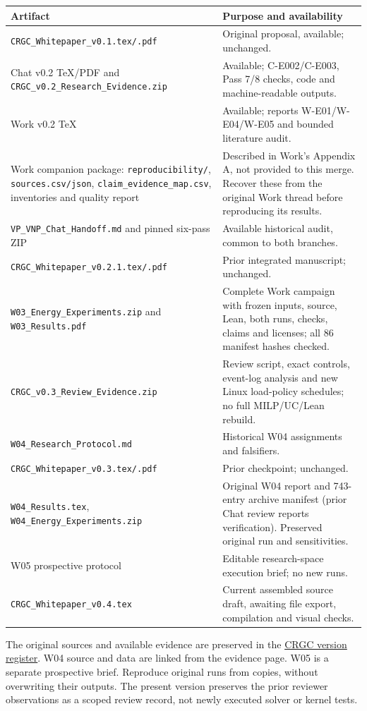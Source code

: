 \documentclass[11pt,letterpaper]{article}
\begin{document}
\begin{longtable}{P{.42\linewidth}P{.49\linewidth}}
\toprule Artifact & Purpose and availability\\\midrule\endhead
\texttt{CRGC\_Whitepaper\_v0.1.tex/.pdf} & Original proposal, available; unchanged.\\
Chat v0.2 TeX/PDF and \texttt{CRGC\_v0.2\_Research\_Evidence.zip} & Available; C-E002/C-E003, Pass 7/8 checks, code and machine-readable outputs.\\
Work v0.2 TeX & Available; reports W-E01/W-E04/W-E05 and bounded literature audit.\\
Work companion package: \texttt{reproducibility/}, \texttt{sources.csv/json}, \texttt{claim\_evidence\_map.csv}, inventories and quality report & Described in Work's Appendix A, not provided to this merge. Recover these from the original Work thread before reproducing its results.\\
\texttt{VP\_VNP\_Chat\_Handoff.md} and pinned six-pass ZIP & Available historical audit, common to both branches.\\
\texttt{CRGC\_Whitepaper\_v0.2.1.tex/.pdf} & Prior integrated manuscript; unchanged.\\
\texttt{W03\_Energy\_Experiments.zip} and \texttt{W03\_Results.pdf} & Complete Work campaign with frozen inputs, source, Lean, both runs, checks, claims and licenses; all 86 manifest hashes checked.\\
\texttt{CRGC\_v0.3\_Review\_Evidence.zip} & Review script, exact controls, event-log analysis and new Linux load-policy schedules; no full MILP/UC/Lean rebuild.\\
\texttt{W04\_Research\_Protocol.md} & Historical W04 assignments and falsifiers.\\
\texttt{CRGC\_Whitepaper\_v0.3.tex/.pdf} & Prior checkpoint; unchanged.\\
\texttt{W04\_Results.tex}, \texttt{W04\_Energy\_Experiments.zip} & Original W04 report and 743-entry archive manifest (prior Chat review reports verification). Preserved original run and sensitivities.\\
W05 prospective protocol & Editable research-space execution brief; no new runs.\\
\texttt{CRGC\_Whitepaper\_v0.4.tex} & Current assembled source draft, awaiting file export, compilation and visual checks.\\
\bottomrule
\end{longtable}
The original sources and available evidence are preserved in the \href{https://chatgpt.com/space/page_c22eca223fc88191a109ba88e518d954}{CRGC version register}. W04 source and data are linked from the evidence page. W05 is a separate prospective brief. Reproduce original runs from copies, without overwriting their outputs. The present version preserves the prior reviewer observations as a scoped review record, not newly executed solver or kernel tests.
\end{document}
